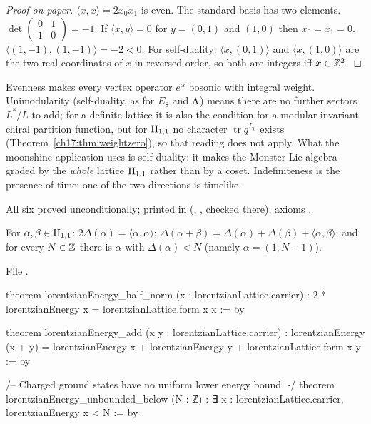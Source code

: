 \begin{proof}[Proof on paper]
$\langle x,x\rangle=2x_0x_1$ is even.  The standard basis has two elements.  $\det\left(\begin{smallmatrix}0&1\\1&0\end{smallmatrix}\right)=-1$.
If $\langle x,y\rangle=0$ for $y=(0,1)$ and $(1,0)$ then $x_0=x_1=0$.  $\langle(1,-1),(1,-1)\rangle=-2<0$.  For
self-duality: $\langle x,(0,1)\rangle$ and $\langle x,(1,0)\rangle$ are the two real coordinates of $x$ in reversed
order, so both are integers iff $x\in{\mathbb{Z}}^2$.
\end{proof}

\begin{physics}
Evenness makes every vertex operator $e^\alpha$ bosonic with integral weight.  Unimodularity (self-duality, as
for $E_8$ and ${\Lambda}$) means there are no further sectors $L^*/L$ to add; for a definite lattice it is also the
condition for a modular-invariant chiral partition function, but for ${\mathrm{II}_{1,1}}$ no character
$\operatorname{tr}q^{L_0}$ exists (Theorem~\ref{ch17:thm:weightzero}), so that reading does not apply.  What the
moonshine application uses is self-duality: it makes the Monster Lie algebra
graded by the \emph{whole} lattice ${\mathrm{II}_{1,1}}$ rather than by a coset.  Indefiniteness is the presence of
time: one of the two directions is timelike.
\end{physics}

\begin{status}
All six proved unconditionally; printed in 
(, ,  checked there);
axioms .
\end{status}

\begin{theorem}[Energy]\label{ch17:thm:energy}
For $\alpha,\beta\in{\mathrm{II}_{1,1}}$: $2\Delta(\alpha)=\langle\alpha,\alpha\rangle$; $\Delta(\alpha+\beta)=\Delta(\alpha)+\Delta(\beta)+\langle\alpha,\beta\rangle$; and for every
$N\in{\mathbb{Z}}$ there is $\alpha$ with $\Delta(\alpha)<N$ (namely $\alpha=(1,N-1)$).
\end{theorem}

\noindent File .
\begin{leancode}
theorem lorentzianEnergy_half_norm (x : lorentzianLattice.carrier) :
    2 * lorentzianEnergy x = lorentzianLattice.form x x := by

theorem lorentzianEnergy_add (x y : lorentzianLattice.carrier) :
    lorentzianEnergy (x + y) = lorentzianEnergy x + lorentzianEnergy y +
      lorentzianLattice.form x y := by

/-- Charged ground states have no uniform lower energy bound. -/
theorem lorentzianEnergy_unbounded_below (N : ℤ) :
    ∃ x : lorentzianLattice.carrier, lorentzianEnergy x < N := by
\end{leancode}


